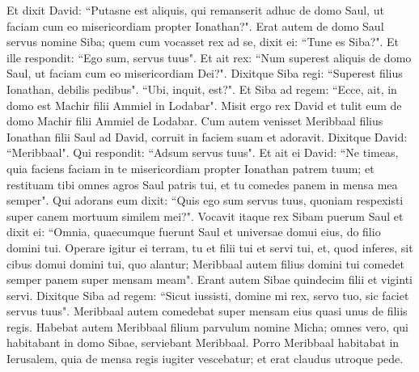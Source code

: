 \begin{biblechapter}  
\verse Et dixit David: “Putasne est aliquis, qui remanserit adhuc de domo Saul, ut faciam cum eo misericordiam propter Ionathan?". 
\verse Erat autem de domo Saul servus nomine Siba; quem cum vocasset rex ad se, dixit ei: “Tune es Siba?". Et ille respondit: “Ego sum, servus tuus". 
\verse Et ait rex: “Num superest aliquis de domo Saul, ut faciam cum eo misericordiam Dei?". Dixitque Siba regi: “Superest filius Ionathan, debilis pedibus". 
\verse “Ubi, inquit, est?". Et Siba ad regem: “Ecce, ait, in domo est Machir filii Ammiel in Lodabar". 
\verse Misit ergo rex David et tulit eum de domo Machir filii Ammiel de Lodabar. 
\verse Cum autem venisset Meribbaal filius Ionathan filii Saul ad David, corruit in faciem suam et adoravit. Dixitque David: “Meribbaal". Qui respondit: “Adsum servus tuus". 
\verse Et ait ei David: “Ne timeas, quia faciens faciam in te misericordiam propter Ionathan patrem tuum; et restituam tibi omnes agros Saul patris tui, et tu comedes panem in mensa mea semper". 
\verse Qui adorans eum dixit: “Quis ego sum servus tuus, quoniam respexisti super canem mortuum similem mei?". 
\verse Vocavit itaque rex Sibam puerum Saul et dixit ei: “Omnia, quaecumque fuerunt Saul et universae domui eius, do filio domini tui. 
\verse Operare igitur ei terram, tu et filii tui et servi tui, et, quod inferes, sit cibus domui domini tui, quo alantur; Meribbaal autem filius domini tui comedet semper panem super mensam meam". Erant autem Sibae quindecim filii et viginti servi. 
\verse Dixitque Siba ad regem: “Sicut iussisti, domine mi rex, servo tuo, sic faciet servus tuus". Meribbaal autem comedebat super mensam eius quasi unus de filiis regis. 
\verse Habebat autem Meribbaal filium parvulum nomine Micha; omnes vero, qui habitabant in domo Sibae, serviebant Meribbaal. 
\verse Porro Meribbaal habitabat in Ierusalem, quia de mensa regis iugiter vescebatur; et erat claudus utroque pede. 
\end{biblechapter}

